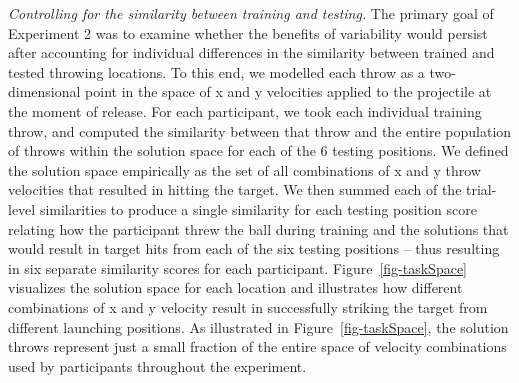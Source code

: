 \documentclass[
  11pt,
  letterpaper,
]{article}
\begin{document}
\emph{Controlling for the similarity between training and testing.} The
primary goal of Experiment 2 was to examine whether the benefits of
variability would persist after accounting for individual differences in
the similarity between trained and tested throwing locations. To this
end, we modelled each throw as a two-dimensional point in the space of x
and y velocities applied to the projectile at the moment of release. For
each participant, we took each individual training throw, and computed
the similarity between that throw and the entire population of throws
within the solution space for each of the 6 testing positions. We
defined the solution space empirically as the set of all combinations of
x and y throw velocities that resulted in hitting the target. We then
summed each of the trial-level similarities to produce a single
similarity for each testing position score relating how the participant
threw the ball during training and the solutions that would result in
target hits from each of the six testing positions -- thus resulting in
six separate similarity scores for each participant.
Figure~\ref{fig-taskSpace} visualizes the solution space for each
location and illustrates how different combinations of x and y velocity
result in successfully striking the target from different launching
positions. As illustrated in Figure~\ref{fig-taskSpace}, the solution
throws represent just a small fraction of the entire space of velocity
combinations used by participants throughout the experiment.
\end{document}
